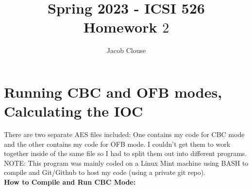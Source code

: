 \documentclass[10pt]{article}
\author{Jacob Clouse}
\title{Spring 2023 - ICSI 526\\Homework $2$}
\begin{document}
\maketitle

\section{Running CBC and OFB modes, Calculating the IOC}
\noindent There are two separate AES files included: One contains my code for CBC mode and the other contains my code for OFB mode. I couldn't get them to work together inside of the same file so I had to split them out into different programs. NOTE: This program was mainly coded on a Linux Mint machine using BASH to compile and Git/Github to host my code (using a private git repo).
\vspace{0.2in}
\\
\noindent \textbf{How to Compile and Run CBC Mode: } 
\end{document}
